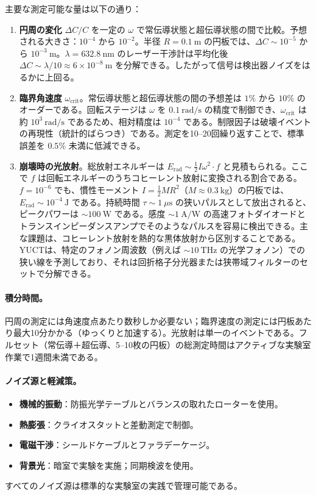 \documentclass[12pt,a4paper]{article}
\begin{document}
	主要な測定可能な量は以下の通り：
	\begin{enumerate}
		\item \textbf{円周の変化} \(\Delta C/C\) を一定の \(\omega\) で常伝導状態と超伝導状態の間で比較。予想される大きさ：\(10^{-4}\) から \(10^{-2}\)。半径 \(R = 0.1\ \text{m}\) の円板では、\(\Delta C \sim 10^{-5}\) から \(10^{-3}\ \text{m}\)。\(\lambda = 632.8\ \text{nm}\) のレーザー干渉計は平均化後 \(\Delta C \sim \lambda/10 \approx 6\times10^{-8}\ \text{m}\) を分解できる。したがって信号は検出器ノイズをはるかに上回る。
		
		\item \textbf{臨界角速度} \(\omega_{\text{crit}}\)。常伝導状態と超伝導状態の間の予想差は \(1\%\) から \(10\%\) のオーダーである。回転ステージは \(\omega\) を \(0.1\ \text{rad/s}\) の精度で制御でき、\(\omega_{\text{crit}}\) は約 \(10^3\ \text{rad/s}\) であるため、相対精度は \(10^{-4}\) である。制限因子は破壊イベントの再現性（統計的ばらつき）である。測定を10–20回繰り返すことで、標準誤差を \(0.5\%\) 未満に低減できる。
		
		\item \textbf{崩壊時の光放射}。総放射エネルギーは \(E_{\text{rad}} \sim \frac{1}{2} I \omega^2 \cdot f\) と見積もられる。ここで \(f\) は回転エネルギーのうちコヒーレント放射に変換される割合である。\(f = 10^{-6}\) でも、慣性モーメント \(I = \frac{1}{2} M R^2\)（\(M \approx 0.3\ \text{kg}\)）の円板では、\(E_{\text{rad}} \sim 10^{-4}\ \text{J}\) である。持続時間 \(\tau \sim 1\ \mu\text{s}\) の狭いパルスとして放出されると、ピークパワーは \(\sim 100\ \text{W}\) である。感度 \(\sim 1\ \text{A/W}\) の高速フォトダイオードとトランスインピーダンスアンプでそのようなパルスを容易に検出できる。主な課題は、コヒーレント放射を熱的な黒体放射から区別することである。YUCTは、特定のフォノン周波数（例えば \(\sim 10\ \text{THz}\) の光学フォノン）での狭い線を予測しており、それは回折格子分光器または狭帯域フィルターのセットで分解できる。
	\end{enumerate}
	
	\paragraph{積分時間。}
	円周の測定には角速度点あたり数秒しか必要ない；臨界速度の測定には円板あたり最大10分かかる（ゆっくりと加速する）。光放射は単一のイベントである。フルセット（常伝導＋超伝導、5–10枚の円板）の総測定時間はアクティブな実験室作業で1週間未満である。
	
	\paragraph{ノイズ源と軽減策。}
	\begin{itemize}
		\item \textbf{機械的振動}：防振光学テーブルとバランスの取れたローターを使用。
		\item \textbf{熱膨張}：クライオスタットと差動測定で制御。
		\item \textbf{電磁干渉}：シールドケーブルとファラデーケージ。
		\item \textbf{背景光}：暗室で実験を実施；同期検波を使用。
	\end{itemize}
	すべてのノイズ源は標準的な実験室の実践で管理可能である。
	
\end{document}
